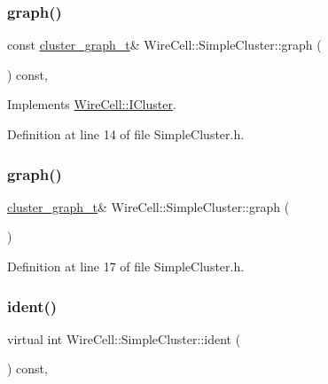 \subsubsection{\texorpdfstring{graph()}{graph()}\hspace{0.1cm}{\footnotesize\ttfamily [1/2]}}
{\footnotesize\ttfamily const \hyperlink{namespace_wire_cell_a6a9ecba14dfba50cdb081820a8bcacbe}{cluster\+\_\+graph\+\_\+t}\& Wire\+Cell\+::\+Simple\+Cluster\+::graph (\begin{DoxyParamCaption}{ }\end{DoxyParamCaption}) const\hspace{0.3cm}{\ttfamily [inline]}, {\ttfamily [virtual]}}



Implements \hyperlink{class_wire_cell_1_1_i_cluster_a974e30bf921937b6b98871525b51dedf}{Wire\+Cell\+::\+I\+Cluster}.



Definition at line 14 of file Simple\+Cluster.\+h.

\mbox{\label{class_wire_cell_1_1_simple_cluster_a45b02f38acf12241504ec515a7d25e32}} 
\subsubsection{\texorpdfstring{graph()}{graph()}\hspace{0.1cm}{\footnotesize\ttfamily [2/2]}}
{\footnotesize\ttfamily \hyperlink{namespace_wire_cell_a6a9ecba14dfba50cdb081820a8bcacbe}{cluster\+\_\+graph\+\_\+t}\& Wire\+Cell\+::\+Simple\+Cluster\+::graph (\begin{DoxyParamCaption}{ }\end{DoxyParamCaption})\hspace{0.3cm}{\ttfamily [inline]}}



Definition at line 17 of file Simple\+Cluster.\+h.

\mbox{\label{class_wire_cell_1_1_simple_cluster_a2566bb51599fbf833d85bcc359d20c82}} 
\subsubsection{\texorpdfstring{ident()}{ident()}}
{\footnotesize\ttfamily virtual int Wire\+Cell\+::\+Simple\+Cluster\+::ident (\begin{DoxyParamCaption}{ }\end{DoxyParamCaption}) const\hspace{0.3cm}{\ttfamily [inline]}, {\ttfamily [virtual]}}



